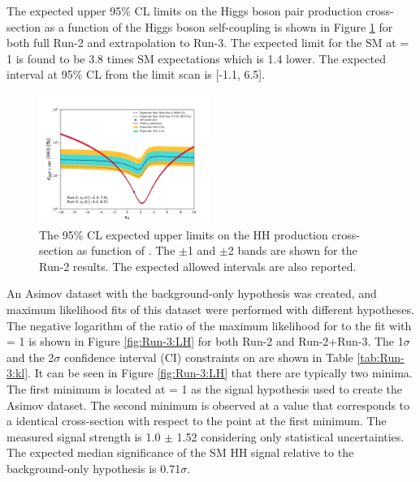 The expected upper 95\% CL limits on the Higgs boson pair production cross-section as a function of the Higgs boson self-coupling \kl is shown in Figure \ref{fig:Run-3:Limit} for both full Run-2 and extrapolation to Run-3. The expected limit for the SM at \kl = 1 is found to be 3.8 times SM expectations which is 1.4 lower. The expected \kl interval at 95\% CL from the limit scan is [-1.1, 6.5].

\begin{figure}[htbp]
    \centering
    \includegraphics[width=0.5\textwidth]{Ch6/Img/kappa_lambda_Run_3_stat.pdf}
     \begin{tcolorbox}[colback=black!5!white, colframe=white!75!black]
    \caption{The 95\% CL expected upper limits on the HH production cross-section as function of \kl. The $\pm$1 and $\pm$2 bands are shown for the Run-2 results. The expected allowed \kl intervals are also reported.}
    \label{fig:Run-3:Limit}
    \end{tcolorbox}
\end{figure}


An Asimov dataset with the background-only hypothesis was created, and maximum likelihood fits of this dataset were performed with different \kl hypotheses. The negative logarithm of the ratio of the maximum likelihood for \kl to the fit with \kl= 1 is shown in Figure \ref{fig:Run-3:LH} for both Run-2 and Run-2+Run-3. The 1$\sigma$ and the 2$\sigma$ confidence interval (CI) constraints on \kl are shown in Table \ref{tab:Run-3:kl}. It can be seen in Figure \ref{fig:Run-3:LH} that there are typically two minima. The first minimum is located at \kl= 1 as the signal hypothesis used to create the Asimov dataset. The second minimum is observed at a \kl value that corresponds to a identical cross-section with respect to the \kl point at the first minimum. The measured signal strength is 1.0 $\pm$ 1.52 considering only statistical uncertainties. The expected median significance of the SM HH signal relative to the background-only hypothesis is 0.71$\sigma$. 

